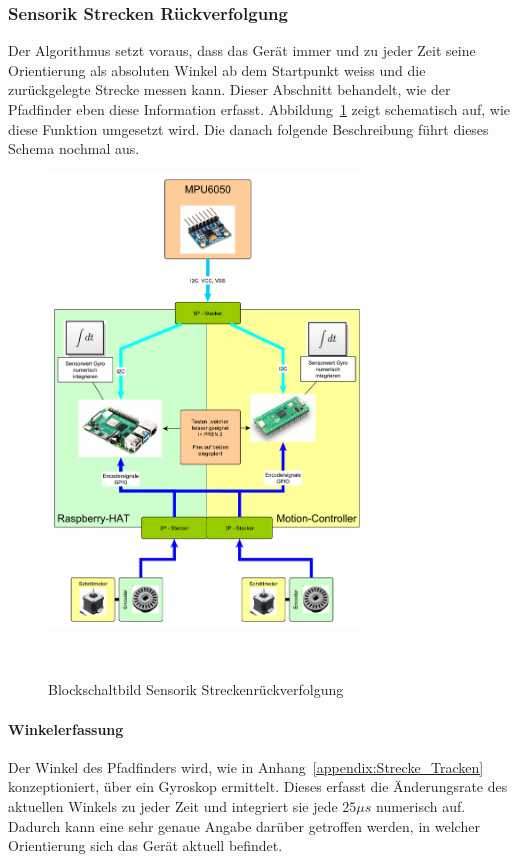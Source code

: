\documentclass[main.tex]{subfiles} %
\begin{document}

\subsubsection{Sensorik Strecken Rückverfolgung}

Der Algorithmus setzt voraus, dass das Gerät immer und zu jeder Zeit seine
Orientierung als absoluten Winkel ab dem Startpunkt weiss und die zurückgelegte
Strecke messen kann. Dieser Abschnitt behandelt, wie der Pfadfinder eben diese
Information erfasst. Abbildung~\ref{fig:Blockschaltbild_StreckenTracken} zeigt
schematisch auf, wie diese Funktion umgesetzt wird. Die danach folgende
Beschreibung führt dieses Schema nochmal aus.

\begin{figure}[h!]
    \centering
    \includegraphics[width=0.75\textwidth]{./fig_Strecke_Tracken/Topologie_MPU6050.pdf}
    \caption{Blockschaltbild Sensorik Streckenrückverfolgung}~\label{fig:Blockschaltbild_StreckenTracken}
\end{figure}

\paragraph{Winkelerfassung}
Der Winkel des Pfadfinders wird, wie in Anhang~\ref{appendix:Strecke_Tracken}
konzeptioniert, über ein Gyroskop ermittelt. Dieses erfasst die Änderungsrate
des aktuellen Winkels zu jeder Zeit und integriert sie jede $25\mu s$ numerisch
auf. Dadurch kann eine sehr genaue Angabe darüber getroffen werden, in welcher
Orientierung sich das Gerät aktuell befindet.
\end{document}
